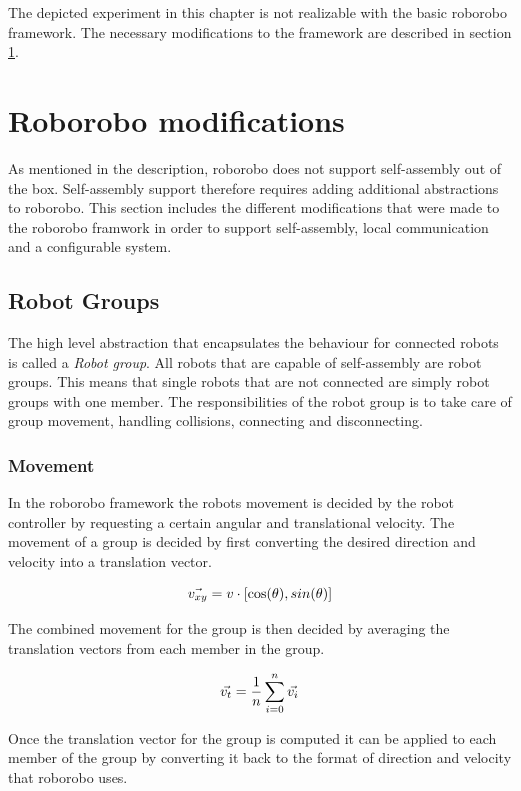 The depicted experiment in this chapter is not realizable with the basic roborobo framework.
The necessary modifications to the framework are described in section \ref{sec:modifications}.

\section{Roborobo modifications}
\label{sec:modifications}
As mentioned in the description, roborobo does not support self-assembly out of the box.
Self-assembly support therefore requires adding additional abstractions to roborobo.
This section includes the different modifications that were made to the roborobo framwork in order to support self-assembly, local communication and a configurable system.

\subsection{Robot Groups}
The high level abstraction that encapsulates the behaviour for connected robots is called a \emph{Robot group}.
All robots that are capable of self-assembly are robot groups.
This means that single robots that are not connected are simply robot groups with one member.
The responsibilities of the robot group is to take care of group movement, handling collisions, connecting and disconnecting. 
	
\subsubsection{Movement}
In the roborobo framework the robots movement is decided by the robot controller by requesting a certain angular and translational velocity.
The movement of a group is decided by first converting the desired direction and velocity into a translation vector.
	
\begin{equation}
	\centering
	\vec{v_{xy}} = v\cdot[\cos(\theta), sin(\theta)]
\end{equation}
	
The combined movement for the group is then decided by averaging the translation vectors from each member in the group.
	
\begin{equation}
	\centering
	\vec{v_t} = \frac{1}{n}\sum_{i=0}^{n} \vec{v_{i}}
\end{equation}
	
Once the translation vector for the group is computed it can be applied to each member of the group by converting it back to the format of direction and velocity that roborobo uses.
	
